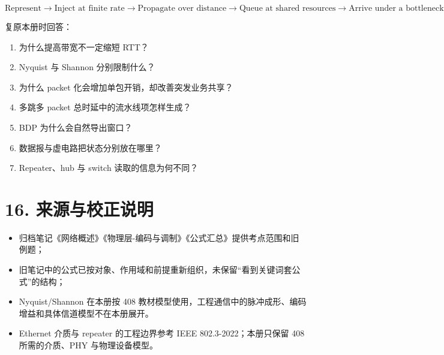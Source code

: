 \documentclass[UTF8,fontset=none,11pt,a4paper]{ctexart}
\providecommand{\tightlist}{\setlength{\itemsep}{0pt}\setlength{\parskip}{0pt}}
\begin{document}
\[
\boxed{
\text{Represent}
\to \text{Inject at finite rate}
\to \text{Propagate over distance}
\to \text{Queue at shared resources}
\to \text{Arrive under a bottleneck}
}
\]

复原本册时回答：

\begin{enumerate}
\def\labelenumi{\arabic{enumi}.}
\tightlist
\item
  为什么提高带宽不一定缩短 RTT？
\item
  Nyquist 与 Shannon 分别限制什么？
\item
  为什么 packet 化会增加单包开销，却改善突发业务共享？
\item
  多跳多 packet 总时延中的流水线项怎样生成？
\item
  BDP 为什么会自然导出窗口？
\item
  数据报与虚电路把状态分别放在哪里？
\item
  Repeater、hub 与 switch 读取的信息为何不同？
\end{enumerate}

\section{16.
来源与校正说明}\label{13-ux6765ux6e90ux4e0eux6821ux6b63ux8bf4ux660e}

\begin{itemize}
\tightlist
\item
  归档笔记《网络概述》《物理层-编码与调制》《公式汇总》提供考点范围和旧例题；
\item
  旧笔记中的公式已按对象、作用域和前提重新组织，未保留``看到关键词套公式''的结构；
\item
  Nyquist/Shannon 在本册按 408
  教材模型使用，工程通信中的脉冲成形、编码增益和具体信道模型不在本册展开。
\item
  Ethernet 介质与 repeater 的工程边界参考 IEEE 802.3-2022；本册只保留 408 所需的介质、PHY 与物理设备模型。
\end{itemize}
\end{document}
